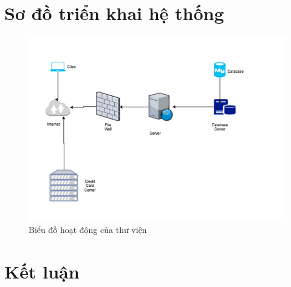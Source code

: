 \documentclass[12pt]{report}
\begin{document}
\section{Sơ đồ triển khai hệ thống}
\begin{figure}[H]
\centering
\includegraphics[width=13cm]{figures/sodo.png}
\caption{Biểu đồ hoạt động của thư viện}
\end{figure}


\section{Kết luận}

\end{document}
